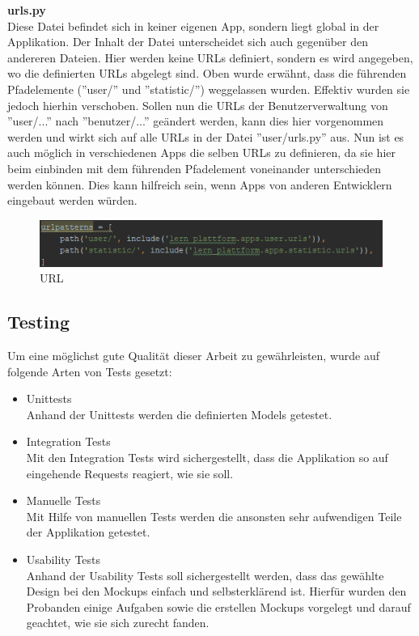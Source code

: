 \textbf{urls.py} \\
Diese Datei befindet sich in keiner eigenen App, sondern liegt global in der Applikation. Der Inhalt der Datei unterscheidet sich auch gegenüber den andereren Dateien. Hier werden keine URLs definiert, sondern es wird angegeben, wo die definierten URLs abgelegt sind. Oben wurde erwähnt, dass die führenden Pfadelemente (''user/'' und ''statistic/'') weggelassen wurden. Effektiv wurden sie jedoch hierhin verschoben. Sollen nun die URLs der Benutzerverwaltung von ''user/...'' nach ''benutzer/...'' geändert werden, kann dies hier vorgenommen werden und wirkt sich auf alle URLs in der Datei ''user/urls.py'' aus. Nun ist es auch möglich in verschiedenen Apps die selben URLs zu definieren, da sie hier beim einbinden mit dem führenden Pfadelement voneinander unterschieden werden können. Dies kann hilfreich sein, wenn Apps von anderen Entwicklern eingebaut werden würden. \\
\begin{minipage}{\textwidth}
	\begin{figure}[H]
		\includegraphics[width=\textwidth, height=\textheight, keepaspectratio]{images/URLglobal.png}
		\caption{URL}
	\end{figure}
\end{minipage}



\subsection{Testing}

Um eine möglichst gute Qualität dieser Arbeit zu gewährleisten, wurde auf folgende Arten von Tests gesetzt:

\begin{itemize}
	\item Unittests \\
		Anhand der Unittests werden die definierten Models getestet. 
		
	\item Integration Tests \\
		Mit den Integration Tests wird sichergestellt, dass die Applikation so auf eingehende Requests reagiert, wie sie soll.
		
	\item Manuelle Tests \\
		Mit Hilfe von manuellen Tests werden die ansonsten sehr aufwendigen Teile der Applikation getestet.
		
	\item Usability Tests \\
		Anhand der Usability Tests soll sichergestellt werden, dass das gewählte Design bei den Mockups einfach und selbsterklärend ist. Hierfür wurden den Probanden einige Aufgaben sowie die erstellen Mockups vorgelegt und darauf geachtet, wie sie sich zurecht fanden.
\end{itemize}

